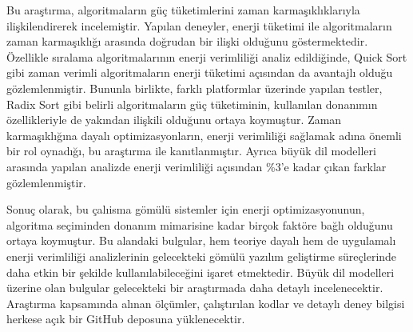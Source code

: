 \documentclass[conference, a4paper]{IEEEtran}
\begin{document}
Bu araştırma, algoritmaların güç tüketimlerini zaman karmaşıklıklarıyla ilişkilendirerek incelemiştir. Yapılan deneyler, enerji tüketimi ile algoritmaların zaman karmaşıklığı arasında doğrudan bir ilişki olduğunu göstermektedir. Özellikle sıralama algoritmalarının enerji verimliliği analiz edildiğinde, Quick Sort gibi zaman verimli algoritmaların enerji tüketimi açısından da avantajlı olduğu gözlemlenmiştir. Bununla birlikte, farklı platformlar üzerinde yapılan testler, Radix Sort gibi belirli algoritmaların güç tüketiminin, kullanılan donanımın özellikleriyle de yakından ilişkili olduğunu ortaya koymuştur. Zaman karmaşıklığına dayalı optimizasyonların, enerji verimliliği sağlamak adına önemli bir rol oynadığı, bu araştırma ile kanıtlanmıştır. Ayrıca büyük dil modelleri arasında yapılan analizde enerji verimliliği açısından \%3'e kadar çıkan farklar gözlemlenmiştir.

Sonuç olarak, bu çalıisma gömülü sistemler için enerji optimizasyonunun, algoritma seçiminden donanım mimarisine kadar birçok faktöre bağlı olduğunu ortaya koymuştur. Bu alandaki bulgular, hem teoriye dayalı hem de uygulamalı enerji verimliliği analizlerinin gelecekteki gömülü yazılım geliştirme süreçlerinde daha etkin bir şekilde kullanılabileceğini işaret etmektedir. Büyük dil modelleri üzerine olan bulgular gelecekteki bir araştırmada daha detaylı incelenecektir. Araştırma kapsamında alınan ölçümler, çalıştırılan kodlar ve detaylı deney bilgisi herkese açık bir GitHub deposuna\cite{github} yüklenecektir.





%
%
\end{document}
